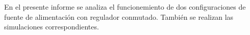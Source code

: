 
En el presente informe se analiza el funcionemiento de dos configuraciones de fuente de alimentación con regulador conmutado. También se realizan las simulaciones correspondientes.
